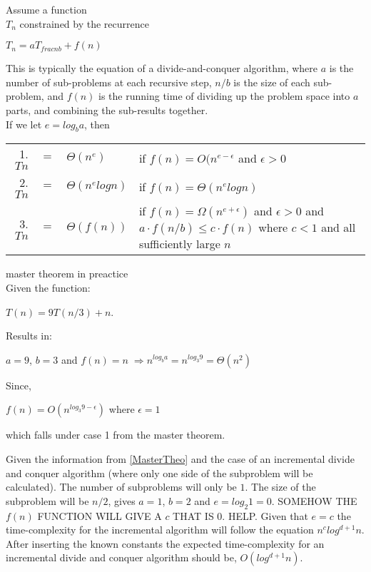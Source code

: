 \begin{theorem}
Assume a function\\ $T_n$ constrained by the recurrence
\begin{center}
$T_n = aT_{frac{n}{b}}+ f(n)$
\end{center}
This is typically the equation of a divide-and-conquer algorithm, where $a$ is the number of sub-problems at each recursive
step, $n/b$ is the size of each sub-problem, and $f(n)$ is the running
time of dividing up the problem space into $a$ parts, and combining
the sub-results together.\\
If we let $e = log_b a$, then
\begin{center}
\begin{tabular}{r c l l}
1. $Tn$ & $=$ & $\Theta(n^{e})$ &  if $f(n) = O(n^{e - \epsilon}$ and $\epsilon > 0$\\
2. $Tn$ & $=$ & $\Theta(n^{e} log n)$ & if $f(n) = \Theta(n^e log n)$\\
3. $Tn$ & $=$ & $\Theta(f(n))$ & \begin{minipage}[t]{0.6 \columnwidth}
  if $f(n) = \Omega(n^{e+\epsilon})$ and $\epsilon > 0$ and $a \cdot f(n/b) \leq c \cdot f(n)$ where $c < 1$ and all sufficiently large $n$
  \end{minipage}
\end{tabular}
\end{center}
\qeda
\end{theorem}

\begin{example}{master theorem in preactice}\cite{Cormen}\\
Given the function:
\begin{center}
 $T(n) = 9T(n/3) + n$.
\end{center}
Results in: 
\begin{center}
$a = 9$, $b = 3$ and $f(n) = n \;
\Rightarrow n^{log_b a} = n^{log_3 9} = \Theta(n^2)$
\end{center}
Since, 
\begin{center}
$f(n) = O(n^{log_3 9 - \epsilon})$ where $\epsilon = 1$
\end{center}
which falls under case 1 from the master theorem.
\end{example}

Given the information from \cref{MasterTheo} and the case of an incremental divide and conquer algorithm (where only one side of the subproblem will be calculated). The number of subproblems will only be $1$. The size of the subproblem will be $n/2$, gives $ a = 1$, $b = 2$ and $e = log_2 1 = 0$. SOMEHOW THE $f(n)$ FUNCTION WILL GIVE A $c$ THAT IS $0$. HELP.
Given that $e = c$ the time-complexity for the incremental algorithm will follow the equation $n^c log^{d+1} n$. After inserting the known constants the expected time-complexity for an incremental divide and conquer algorithm should be, $O(log^{d+1} n)$.
 

